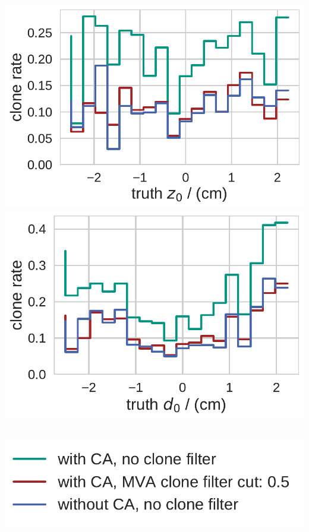 \documentclass[18pt, aspectratio=169]{beamer}
\begin{document}
\begin{frame}
\begin{columns}
    \begin{column}{.5\textwidth}
      \centering
      \includegraphics[width=.55\textwidth]{figures/clone_rate_by_z0_truth_fullreco.pdf}\\
      \includegraphics[width=.55\textwidth]{figures/clone_rate_by_d0_truth_fullreco.pdf}
    \end{column}
  \end{columns}
  \begin{center}
    \includegraphics[width=.25\textwidth]{figures/legend_fom_profile.pdf}\\
  \end{center}
\end{frame}
\end{document}
